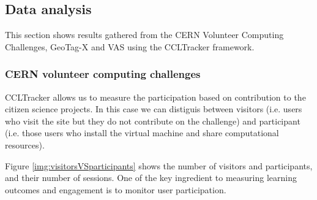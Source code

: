 \documentclass{article}
\begin{document}
%
%
%
%
%
%
%
%
%
%      
%      
%
%




\subsection{Data analysis}



This section shows results gathered from the CERN Volunteer Computing Challenges, GeoTag-X and VAS using the CCLTracker framework. 

\subsubsection{CERN volunteer computing challenges}

CCLTracker allows us to measure the participation based on contribution to the citizen science projects. In this case we can distiguis between visitors (i.e. users who visit the site but they do not contribute on the challenge) and participant (i.e. those users who install the virtual machine and share computational resources). 

Figure \ref{img:visitorsVSparticipants} shows the number of visitors and participants, and their number of sessions. One of the key ingredient to measuring learning outcomes and engagement is to monitor user participation. 
\end{document}
